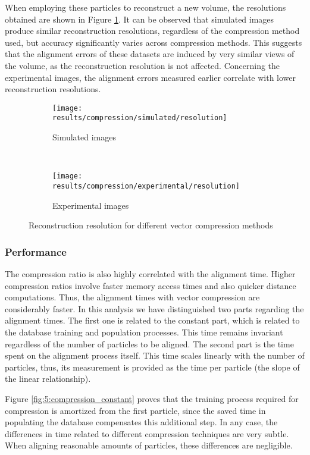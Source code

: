\documentclass[../main.tex]{subfiles}
\begin{document}
When employing these particles to reconstruct a new volume, the resolutions obtained are shown in Figure \ref{fig:5:compression_resolution}. It can be observed that simulated images produce similar reconstruction resolutions, regardless of the compression method used, but accuracy significantly varies across compression methods. This suggests that the alignment errors of these datasets are induced by very similar views of the volume, as the reconstruction resolution is not affected. Concerning the experimental images, the alignment errors measured earlier correlate with lower reconstruction resolutions.

\begin{figure}[htbp]
    \centering
    \begin{subfigure}[b]{.8\textwidth}
         \centering
         \texttt{[image: results/compression/simulated/resolution]}
         \caption{Simulated images}
    \end{subfigure}\\
    \vspace{2em}
    \begin{subfigure}[b]{.8\textwidth}
         \centering
         \texttt{[image: results/compression/experimental/resolution]}
         \caption{Experimental images}
    \end{subfigure}
    \caption{Reconstruction resolution for different vector compression methods}
    \label{fig:5:compression_resolution}
\end{figure}

\subsubsection{Performance}
The compression ratio is also highly correlated with the alignment time. Higher compression ratios involve faster memory access times and also quicker distance computations. Thus, the alignment times with vector compression are considerably faster. In this analysis we have distinguished two parts regarding the alignment times. The first one is related to the constant part, which is related to the database training and population processes. This time remains invariant regardless of the number of particles to be aligned. The second part is the time spent on the alignment process itself. This time scales linearly with the number of particles, thus, its measurement is provided as the time per particle (the slope of the linear relationship).

Figure \ref{fig:5:compression_constant} proves that the training process required for compression is amortized from the first particle, since the saved time in populating the database compensates this additional step. In any case, the differences in time related to different compression techniques are very subtle. When aligning reasonable amounts of particles, these differences are negligible.
\end{document}
